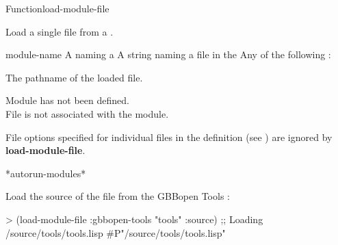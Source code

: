 \documentclass[10pt,twoside,english,pdftex]{article}
\begin{document}
\begin{functiondoc}{Function}{load-module-file}%
  { 
      
    \returns{} }
%
% 

\fnsyntax 

\fnpurpose Load a single file from a .

\fnpackage {}

\fnmodule {}

\fnargs
\begin{args}{module-name}
 A  naming a 
 A string naming a file in the 
\arg[option] Any of the following : 
\loadonefilemoduleoptions
\end{args}

\fnreturns The pathname of the loaded file.

\fnerrors Module  has not been defined.\\
%
File  is not associated with the module.

\relativedircircularity

\fndescription File options specified for individual files in the
 definition (see \textbf{}) are
ignored by \textbf{load-module-file}.

\begin{alsos}{*autorun-modules*}
\end{alsos}

\fnexample Load the source of the file  from the GBBopen
Tools :
%
\W\supp
\begin{example}
> (load-module-file :gbbopen-tools "tools" :source)
;; Loading /source/tools/tools.lisp
#P"/source/tools/tools.lisp"
\end{example}

\end{functiondoc}

\end{document}

